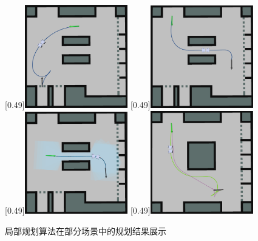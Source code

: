 \documentclass[master,academic]{ysuthesis} %
\begin{document}
	\begin{figure}[H]
		\centering
		[0.49\textwidth]{\includegraphics[width=0.4\textwidth]{s1.png}}
		[0.49\textwidth]{\includegraphics[width=0.4\textwidth]{s2.png}}
		[0.49\textwidth]{\includegraphics[width=0.4\textwidth]{s3.png}}
		[0.49\textwidth]{\includegraphics[width=0.4\textwidth]{s4.png}}
		\caption{局部规划算法在部分场景中的规划结果展示}
		\label{fig:局部规划仿真案例}
	\end{figure}
\end{document}
